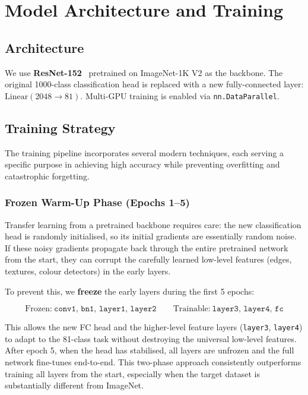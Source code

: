 \documentclass[12pt, a4paper]{article}
\begin{document}
\section{Model Architecture and Training}
\label{sec:training}

\subsection{Architecture}

We use \textbf{ResNet-152}~\cite{he2016resnet} pretrained on ImageNet-1K V2 as
the backbone.  The original 1000-class classification head is replaced with a
new fully-connected layer: $\text{Linear}(2048 \to 81)$.  Multi-GPU training is
enabled via \texttt{nn.DataParallel}.

\subsection{Training Strategy}

The training pipeline incorporates several modern techniques, each serving a
specific purpose in achieving high accuracy while preventing overfitting and
catastrophic forgetting.

\subsubsection{Frozen Warm-Up Phase (Epochs 1--5)}

Transfer learning from a pretrained backbone requires care: the new
classification head is randomly initialised, so its initial gradients are
essentially random noise.  If these noisy gradients propagate back through the
entire pretrained network from the start, they can corrupt the carefully learned
low-level features (edges, textures, colour detectors) in the early layers.

To prevent this, we \textbf{freeze} the early layers during the first 5 epochs:

\begin{equation}
\text{Frozen:}~ \texttt{conv1, bn1, layer1, layer2} \qquad
\text{Trainable:}~ \texttt{layer3, layer4, fc}
\end{equation}

This allows the new FC head and the higher-level feature layers (\texttt{layer3},
\texttt{layer4}) to adapt to the 81-class task without destroying the universal
low-level features.  After epoch 5, when the head has stabilised, all layers
are unfrozen and the full network fine-tunes end-to-end.  This two-phase approach
consistently outperforms training all layers from the start, especially when the
target dataset is substantially different from ImageNet.
\end{document}
